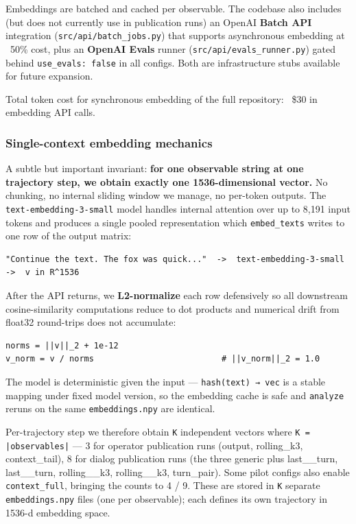 \documentclass{article}
\theoremstyle{plain}
\theoremstyle{definition}
\begin{document}
Embeddings are batched and cached per observable. The codebase also
includes (but does not currently use in publication runs) an OpenAI
\textbf{Batch API} integration (\texttt{src/api/batch\_jobs.py}) that supports
asynchronous embedding at ~50\% cost, plus an \textbf{OpenAI Evals} runner
(\texttt{src/api/evals\_runner.py}) gated behind \texttt{use\_evals: false} in all
configs. Both are infrastructure stubs available for future expansion.

Total token cost for synchronous embedding of the full repository:
~\$30 in embedding API calls.

\subsubsection{Single-context embedding mechanics}

A subtle but important invariant: \textbf{for one observable string at one
trajectory step, we obtain exactly one 1536-dimensional vector.} No
chunking, no internal sliding window we manage, no per-token outputs.
The \texttt{text-embedding-3-small} model handles internal attention over up
to 8,191 input tokens and produces a single pooled representation
which \texttt{embed\_texts} writes to one row of the output matrix:

\begin{verbatim}
"Continue the text. The fox was quick..."  ->  text-embedding-3-small  ->  v in R^1536
\end{verbatim}

After the API returns, we \textbf{L2-normalize} each row defensively so all
downstream cosine-similarity computations reduce to dot products and
numerical drift from float32 round-trips does not accumulate:

\begin{verbatim}
norms = ||v||_2 + 1e-12
v_norm = v / norms                          # ||v_norm||_2 = 1.0
\end{verbatim}

The model is deterministic given the input — \texttt{hash(text) → vec} is a
stable mapping under fixed model version, so the embedding cache is
safe and \texttt{analyze} reruns on the same \texttt{embeddings.npy} are identical.

Per-trajectory step we therefore obtain \texttt{K} independent vectors where
\texttt{K = |observables|} — 3 for operator publication runs (output,
rolling\_k3, context\_tail), 8 for dialog publication runs (the three
generic plus last\_<role-A>\_turn, last\_<role-B>\_turn,
rolling\_<role-A>\_k3, rolling\_<role-B>\_k3, turn\_pair). Some pilot
configs also enable \texttt{context\_full}, bringing the counts to 4 / 9.
These are stored in \texttt{K} separate \texttt{embeddings.npy} files (one per
observable); each defines its own trajectory in 1536-d embedding
space.
\end{document}
